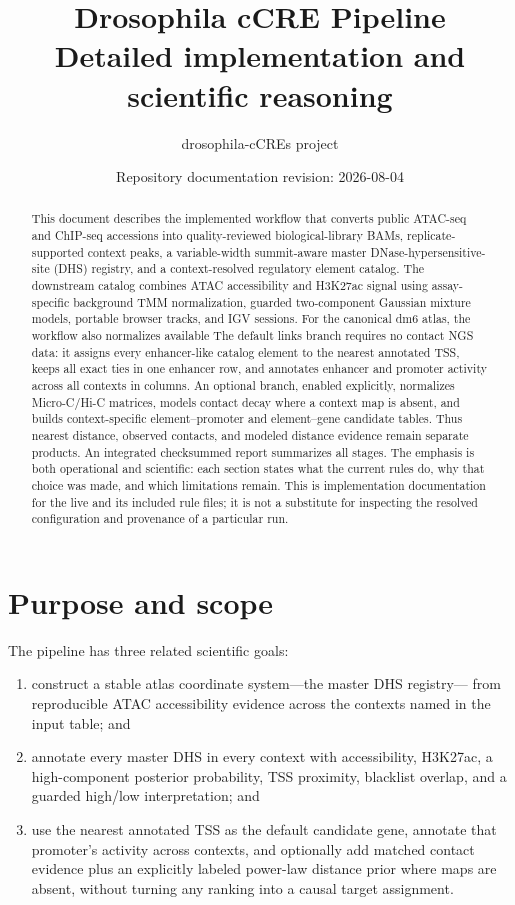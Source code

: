 \documentclass[11pt]{article}
\title{\textbf{Drosophila cCRE Pipeline}\\[0.3em]
\large Detailed implementation and scientific reasoning}
\author{drosophila-cCREs project}
\date{Repository documentation revision: 2026-08-04}
\newcommand{\filep}[1]{\path{#1}}
\begin{document}
\maketitle

\begin{abstract}
This document describes the implemented workflow that converts public
ATAC-seq and ChIP-seq accessions into quality-reviewed biological-library
BAMs, replicate-supported context peaks, a variable-width summit-aware master
DNase-hypersensitive-site (DHS) registry, and a context-resolved regulatory
element catalog.  The downstream catalog combines ATAC accessibility and
H3K27ac signal using assay-specific background TMM normalization, guarded
two-component Gaussian mixture models, portable browser tracks, and IGV
sessions.  For the canonical dm6 atlas, the workflow also normalizes available
The default links branch requires no contact NGS data: it assigns every
enhancer-like catalog element to the nearest annotated TSS, keeps all exact
ties in one enhancer row, and annotates enhancer and promoter activity across
all contexts in columns.  An optional branch, enabled explicitly, normalizes
Micro-C/Hi-C matrices, models contact decay where a context map is absent, and
builds context-specific element--promoter and element--gene candidate tables.
Thus nearest distance, observed contacts, and modeled distance evidence remain
separate products.
An integrated checksummed report summarizes all stages.  The emphasis is both operational and
scientific: each section states what the current rules do, why that choice was
made, and which limitations remain.  This is implementation documentation for
the live \filep{workflow/Snakefile} and its included rule files; it is not a
substitute for inspecting the resolved configuration and provenance of a
particular run.
\end{abstract}

\tableofcontents
\newpage

\section{Purpose and scope}

The pipeline has three related scientific goals:

\begin{enumerate}
  \item construct a stable atlas coordinate system---the master DHS registry---
  from reproducible ATAC accessibility evidence across the contexts named in
  the input table; and
  \item annotate every master DHS in every context with accessibility,
H3K27ac, a high-component posterior probability, TSS proximity, blacklist
  overlap, and a guarded high/low interpretation; and
  \item use the nearest annotated TSS as the default candidate gene, annotate
  that promoter's activity across contexts, and optionally add matched contact
  evidence plus an explicitly labeled power-law distance prior where maps are
  absent, without turning any ranking into a causal target assignment.
\end{enumerate}
\end{document}
